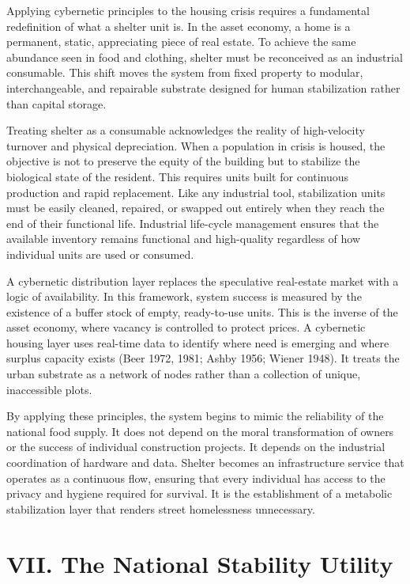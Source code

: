 \documentclass[
  12pt,
]{article}
\begin{document}
Applying cybernetic principles to the housing crisis requires a fundamental redefinition of what a shelter unit is. In the asset economy, a home is a permanent, static, appreciating piece of real estate. To achieve the same abundance seen in food and clothing, shelter must be reconceived as an industrial consumable. This shift moves the system from fixed property to modular, interchangeable, and repairable substrate designed for human stabilization rather than capital storage.

Treating shelter as a consumable acknowledges the reality of high-velocity turnover and physical depreciation. When a population in crisis is housed, the objective is not to preserve the equity of the building but to stabilize the biological state of the resident. This requires units built for continuous production and rapid replacement. Like any industrial tool, stabilization units must be easily cleaned, repaired, or swapped out entirely when they reach the end of their functional life. Industrial life-cycle management ensures that the available inventory remains functional and high-quality regardless of how individual units are used or consumed.

A cybernetic distribution layer replaces the speculative real-estate market with a logic of availability. In this framework, system success is measured by the existence of a buffer stock of empty, ready-to-use units. This is the inverse of the asset economy, where vacancy is controlled to protect prices. A cybernetic housing layer uses real-time data to identify where need is emerging and where surplus capacity exists (Beer 1972, 1981; Ashby 1956; Wiener 1948). It treats the urban substrate as a network of nodes rather than a collection of unique, inaccessible plots.

By applying these principles, the system begins to mimic the reliability of the national food supply. It does not depend on the moral transformation of owners or the success of individual construction projects. It depends on the industrial coordination of hardware and data. Shelter becomes an infrastructure service that operates as a continuous flow, ensuring that every individual has access to the privacy and hygiene required for survival. It is the establishment of a metabolic stabilization layer that renders street homelessness unnecessary.

\hypertarget{vii.-the-national-stability-utility}{%
\section{VII. The National Stability Utility}\label{vii.-the-national-stability-utility}}
\end{document}
